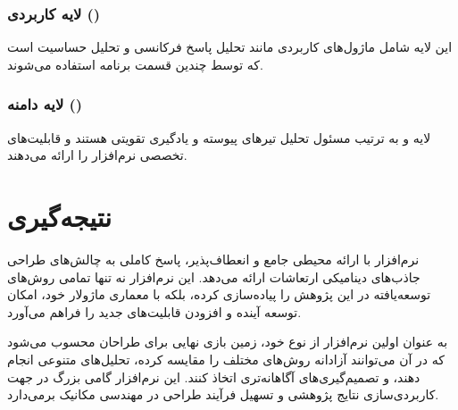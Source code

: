 \subsubsection{لایه کاربردی ()}

این لایه شامل ماژول‌های کاربردی مانند تحلیل پاسخ فرکانسی و تحلیل حساسیت است که توسط چندین قسمت برنامه استفاده می‌شوند.

\subsubsection{لایه دامنه ()}

لایه  و  به ترتیب مسئول تحلیل تیرهای پیوسته و یادگیری تقویتی هستند و قابلیت‌های تخصصی نرم‌افزار را ارائه می‌دهند.

\section{نتیجه‌گیری}

نرم‌افزار  با ارائه محیطی جامع و انعطاف‌پذیر، پاسخ کاملی به چالش‌های طراحی جاذب‌های دینامیکی ارتعاشات ارائه می‌دهد. این نرم‌افزار نه تنها تمامی روش‌های توسعه‌یافته در این پژوهش را پیاده‌سازی کرده، بلکه با معماری ماژولار خود، امکان توسعه آینده و افزودن قابلیت‌های جدید را فراهم می‌آورد.

 به عنوان اولین نرم‌افزار از نوع خود، زمین بازی نهایی برای طراحان محسوب می‌شود که در آن می‌توانند آزادانه روش‌های مختلف را مقایسه کرده، تحلیل‌های متنوعی انجام دهند، و تصمیم‌گیری‌های آگاهانه‌تری اتخاذ کنند. این نرم‌افزار گامی بزرگ در جهت کاربردی‌سازی نتایج پژوهشی و تسهیل فرآیند طراحی در مهندسی مکانیک برمی‌دارد. 






